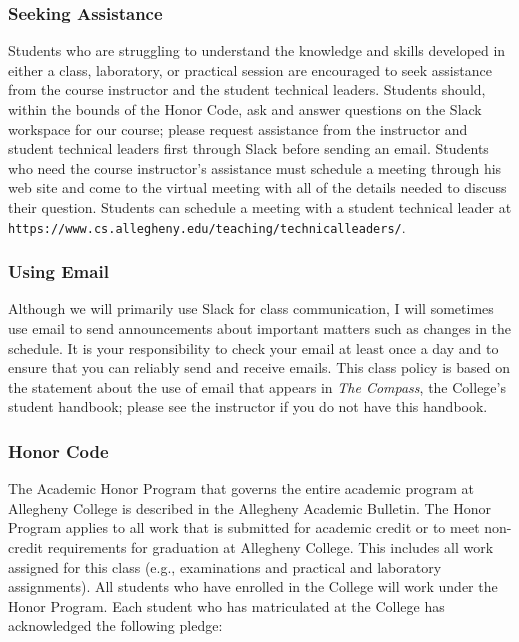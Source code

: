 \documentclass[11pt]{article}
\newcommand{\instructorpronoun}[1]{his}
\newcommand{\url}[1]{\lstinline{#1}}
\begin{document}
\vspace*{-.05in}

\subsubsection*{Seeking Assistance}

Students who are struggling to understand the knowledge and skills developed in
either a class, laboratory, or practical session are encouraged to seek
assistance from the course instructor and the student technical leaders.
Students should, within the bounds of the Honor Code, ask and answer questions
on the Slack workspace for our course; please request assistance from the
instructor and student technical leaders first through Slack before sending an
email. Students who need the course instructor's assistance must schedule a
meeting through \instructorpronoun{} web site and come to the virtual meeting
with all of the details needed to discuss their question. Students can schedule
a meeting with a student technical leader at
\url{https://www.cs.allegheny.edu/teaching/technicalleaders/}.

\vspace*{-.05in}

\subsubsection*{Using Email}

Although we will primarily use Slack for class communication, I will sometimes
use email to send announcements about important matters such as changes in the
schedule. It is your responsibility to check your email at least once a day and
to ensure that you can reliably send and receive emails. This class policy is
based on the statement about the use of email that appears in {\em The Compass},
the College's student handbook; please see the instructor if you do not have
this handbook.

\vspace*{-.1in}

\subsubsection*{Honor Code}

The Academic Honor Program that governs the entire academic program at
Allegheny College is described in the Allegheny Academic Bulletin. The Honor
Program applies to all work that is submitted for academic credit or to meet
non-credit requirements for graduation at Allegheny College. This includes all
work assigned for this class (e.g., examinations and practical and laboratory
assignments). All students who have enrolled in the College will work under the
Honor Program. Each student who has matriculated at the College has
acknowledged the following pledge:
\end{document}
